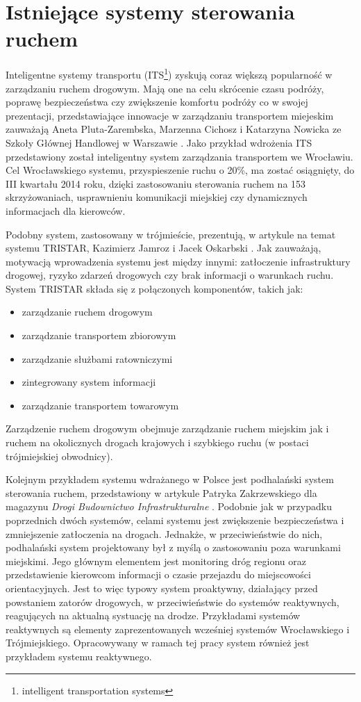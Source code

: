 \section{Istniejące systemy sterowania ruchem}
Inteligentne systemy transportu (ITS\footnote{intelligent transportation systems}) zyskują coraz większą popularność w zarządzaniu ruchem drogowym.
Mają one na celu skrócenie czasu podróży, poprawę bezpieczeństwa czy zwiększenie komfortu podróży co w swojej prezentacji, przedstawiające innowacje w zarządzaniu transportem miejeskim zauważają Aneta Pluta-Zarembska, Marzenna Cichosz i Katarzyna Nowicka ze Szkoły Głównej Handlowej w Warszawie \cite{pluta-zaremba+cichosz+nowicka}. Jako przykład wdrożenia ITS przedstawiony został inteligentny system zarządzania transportem we Wrocławiu. Cel Wrocławskiego systemu, przyspieszenie ruchu o 20\%,  ma zostać osiągnięty, do III kwartału 2014 roku, dzięki zastosowaniu sterowania ruchem na 153 skrzyżowaniach, usprawnieniu komunikacji miejskiej czy dynamicznych informacjach dla kierowców.

Podobny system, zastosowany w trójmieście, prezentują, w artykule na temat systemu TRISTAR, Kazimierz Jamroz i Jacek Oskarbski \cite{jamroz+oskarbski}. Jak zauważają, motywacją wprowadzenia systemu jest między innymi: zatłoczenie infrastruktury drogowej, ryzyko zdarzeń drogowych czy brak informacji o warunkach ruchu. System TRISTAR składa się z połączonych komponentów, takich jak:
\begin{itemize}
	\item zarządzanie ruchem drogowym
	\item zarządzanie transportem zbiorowym
	\item zarządzanie służbami ratowniczymi
	\item zintegrowany system informacji
	\item zarządzanie transportem towarowym
\end{itemize}
Zarządzenie ruchem drogowym obejmuje zarządzanie ruchem miejskim jak i ruchem na okolicznych drogach krajowych i szybkiego ruchu (w postaci trójmiejskiej obwodnicy).

Kolejnym przykładem systemu wdrażanego w Polsce jest podhalański system sterowania ruchem, przedstawiony w artykule Patryka Zakrzewskiego dla magazynu \textit{Drogi Budownictwo Infrastrukturalne} \cite{zakrzewski}. Podobnie jak w przypadku poprzednich dwóch systemów, celami systemu jest zwiększenie bezpieczeństwa i zmniejszenie zatłoczenia na drogach. Jednakże, w przeciwieństwie do nich, podhalański system projektowany był z myślą o zastosowaniu poza warunkami miejskimi. Jego głównym elementem jest monitoring dróg regionu oraz przedstawienie kierowcom informacji o czasie przejazdu do miejscowości orientacyjnych. Jest to więc typowy system proaktywny, działający przed powstaniem zatorów drogowych, w przeciwieństwie do systemów reaktywnych, reagujących na aktualną systuację na drodze. Przykładami systemów reaktywnych są elementy zaprezentowanych wcześniej systemów Wrocławskiego i Trójmiejskiego. Opracowywany w ramach tej pracy system również jest przykładem systemu reaktywnego.